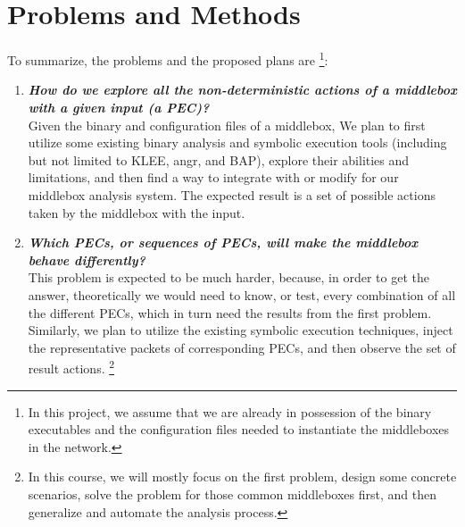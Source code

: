 \section{Problems and Methods}

To summarize, the problems and the proposed plans are
\footnote{In this project, we assume that we are already in possession of the
binary executables and the configuration files needed to instantiate the
middleboxes in the network.}:

\begin{enumerate}
\item \textit{\textbf{How do we explore all the non-deterministic actions of a
    middlebox with a given input (a PEC)?}}\\
        Given the binary and configuration files of a middlebox, We plan to
        first utilize some existing binary analysis and symbolic execution tools
        (including but not limited to KLEE, angr, and BAP), explore their
        abilities and limitations, and then find a way to integrate with or
        modify for our middlebox analysis system. The expected result is a set
        of possible actions taken by the middlebox with the input.
\item \textit{\textbf{Which PECs, or sequences of PECs, will make the middlebox
    behave differently?}} \cite{2017-PandaEtAl}\\
        This problem is expected to be much harder, because, in order to get the
        answer, theoretically we would need to know, or test, every combination
        of all the different PECs, which in turn need the results from the first
        problem. Similarly, we plan to utilize the existing symbolic execution
        techniques, inject the representative packets of corresponding PECs, and
        then observe the set of result actions.
        \footnote{In this course, we will mostly focus on the first problem,
        design some concrete scenarios, solve the problem for those common
        middleboxes first, and then generalize and automate the analysis
        process.}
\end{enumerate}



